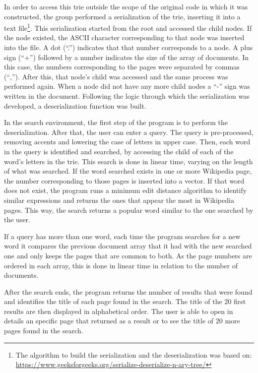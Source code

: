 \documentclass{article}
\begin{document}

In order to access this trie outside the scope of the original code in which it was constructed, the group performed a serialization of the trie, inserting it into a text file\footnote{The algorithm to build the serialization and the deserialization was based on: \url{https://www.geeksforgeeks.org/serialize-deserialize-n-ary-tree/}}. This serialization started from the root and accessed the child nodes. If the node existed, the ASCII character corresponding to that node was inserted into the file. A dot (``.'') indicates that that number corresponds to a node. A plus sign (``+'') followed by a number indicates the size of the array of documents. In this case, the numbers corresponding to the pages were separated by commas (``,''). After this, that node's child was accessed and the same process was performed again. When a node did not have any more child nodes a ``-'' sign was written in the document. Following the logic through which the serialization was developed, a deserialization function was built. 

In the search environment, the first step of the program is to perform the deserialization. After that, the user can enter a query.  The query is pre-processed, removing accents and lowering the case of letters in upper case. Then, each word in the query is identified and searched, by accessing the child of each of the word's letters in the trie. This search is done in linear time, varying on the length of what was searched. If the word searched exists in one or more Wikipedia page, the number corresponding to those pages is inserted into a vector. If that word does not exist, the program runs a minimum edit distance algorithm to identify similar expressions and returns the ones that appear the most in Wikipedia pages. This way, the search returns a popular word similar to the one searched by the user. 

If a query has more than one word, each time the program searches for a new word it compares the previous document array that it had with the new searched one and only keeps the pages that are common to both. As the page numbers are ordered in each array, this is done in linear time in relation to the number of documents. 

After the search ends, the program returns the number of results that were found and identifies the title of each page found in the search. The title of the 20 first results are then displayed in alphabetical order. The user is able to open in details an specific page that returned as a result or to see the title of 20 more pages found in the search. 
\end{document}
